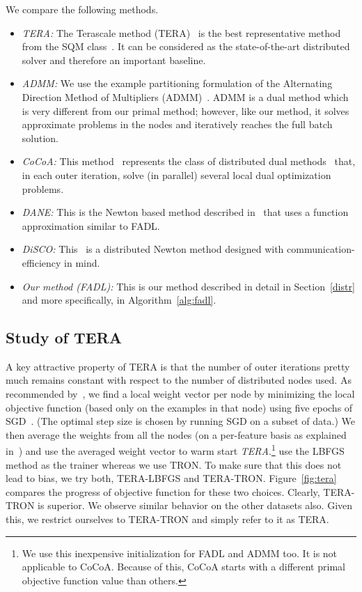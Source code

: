 \documentclass[twoside, 11pt]{article}
\begin{document}
We compare the following methods.
\begin{itemize}
\item {\it{TERA:}}
The Terascale method (TERA)~\citep{agarwal2011} is the best representative method from the SQM class~\citep{chu2006}. It can be considered as the state-of-the-art distributed solver and therefore an important baseline.
\item {\it{ADMM:}}
We use the example partitioning formulation of the Alternating Direction Method of Multipliers (ADMM)~\citep{Boyd2011, zhang2012}. ADMM is a dual method which is very different from our primal method; however, like our method, it solves approximate problems in the nodes and iteratively reaches the full batch solution.
\item {\it{CoCoA:}}
This method~\citep{jaggi2014} represents the class of distributed dual methods~\citep{pechyony2011, yang2013a, yang2013b, jaggi2014} that, in each outer iteration, solve (in parallel) several local dual optimization problems.
\item {\it{DANE:}}
This is the Newton based method described in~\citet{sharir2014} that uses a function approximation similar to FADL.
\item {\it {DiSCO:}}
This~\citep{discoicml} is a distributed Newton method designed with communication-efficiency in mind.
\item {\it{Our method (FADL):}}
This is our method described in detail in Section~\ref{distr} and more specifically, in Algorithm~\ref{alg:fadl}.
\end{itemize}

\subsection{Study of TERA}
\label{subsec:tera}

A key attractive property of TERA is that the number of outer iterations pretty much remains constant with respect to the number of distributed nodes used. As recommended by~\citet{agarwal2011}, we find a local weight vector per node by minimizing the local objective function (based only on the examples in that node) using five epochs of SGD~\citep{bottou2010}. (The optimal step size is chosen by running SGD on a subset of data.) We then average the weights from all the nodes (on a per-feature basis as explained in~\citet{agarwal2011}) and use the averaged weight vector to warm start {\it{TERA}}.\footnote{We use this inexpensive initialization for FADL and ADMM too. It is not applicable to CoCoA. Because of this, CoCoA starts with a different primal objective function value than others.} \citet{agarwal2011} use the LBFGS method as the trainer whereas we use TRON. To make sure that this does not lead to bias, we try both, TERA-LBFGS and TERA-TRON. Figure~\ref{fig:tera} compares the progress of objective function for these two choices. Clearly, TERA-TRON is superior. We observe similar behavior on the other datasets also. Given this, we restrict ourselves to TERA-TRON and simply refer to it as TERA.
\end{document}
